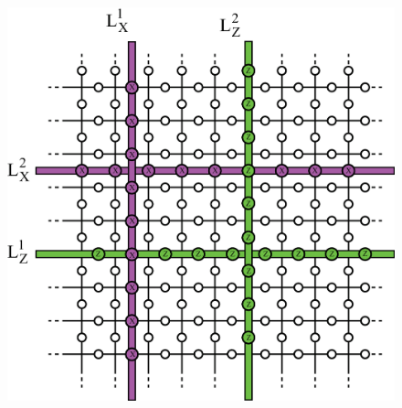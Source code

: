 \documentclass[a4paper,11pt]{ltjsarticle}
\begin{document}
{    \begin{figure}[h]
        \centering
        \includegraphics[scale=0.40]{figure/logical_operator.eps}
        \vspace{0pt}\caption{}
        \label{logical_operator}
        \vspace{-10pt}
    \end{figure}
}
\end{document}
